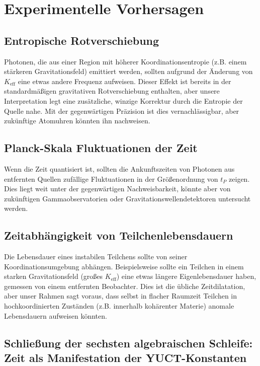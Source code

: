 \documentclass[12pt,a4paper]{article}
\newcommand{\Keff}{K_{\mathrm{eff}}}
\begin{document}
	\section{Experimentelle Vorhersagen}
	\label{sec:predictions}
	
	\subsection{Entropische Rotverschiebung}
	
	Photonen, die aus einer Region mit höherer Koordinationsentropie (z.B. einem stärkeren Gravitationsfeld) emittiert werden, sollten aufgrund der Änderung von \(\Keff\) eine etwas andere Frequenz aufweisen. Dieser Effekt ist bereits in der standardmäßigen gravitativen Rotverschiebung enthalten, aber unsere Interpretation legt eine zusätzliche, winzige Korrektur durch die Entropie der Quelle nahe. Mit der gegenwärtigen Präzision ist dies vernachlässigbar, aber zukünftige Atomuhren könnten ihn nachweisen.
	
	\subsection{Planck-Skala Fluktuationen der Zeit}
	
	Wenn die Zeit quantisiert ist, sollten die Ankunftszeiten von Photonen aus entfernten Quellen zufällige Fluktuationen in der Größenordnung von \(t_P\) zeigen. Dies liegt weit unter der gegenwärtigen Nachweisbarkeit, könnte aber von zukünftigen Gammaobservatorien oder Gravitationswellendetektoren untersucht werden.
	
	\subsection{Zeitabhängigkeit von Teilchenlebensdauern}
	
	Die Lebensdauer eines instabilen Teilchens sollte von seiner Koordinationsumgebung abhängen. Beispielsweise sollte ein Teilchen in einem starken Gravitationsfeld (großes \(\Keff\)) eine etwas längere Eigenlebensdauer haben, gemessen von einem entfernten Beobachter. Dies ist die übliche Zeitdilatation, aber unser Rahmen sagt voraus, dass selbst in flacher Raumzeit Teilchen in hochkoordinierten Zuständen (z.B. innerhalb kohärenter Materie) anomale Lebensdauern aufweisen könnten.
	
	\subsection{Schließung der sechsten algebraischen Schleife: Zeit als Manifestation der YUCT-Konstanten}
	
\end{document}
